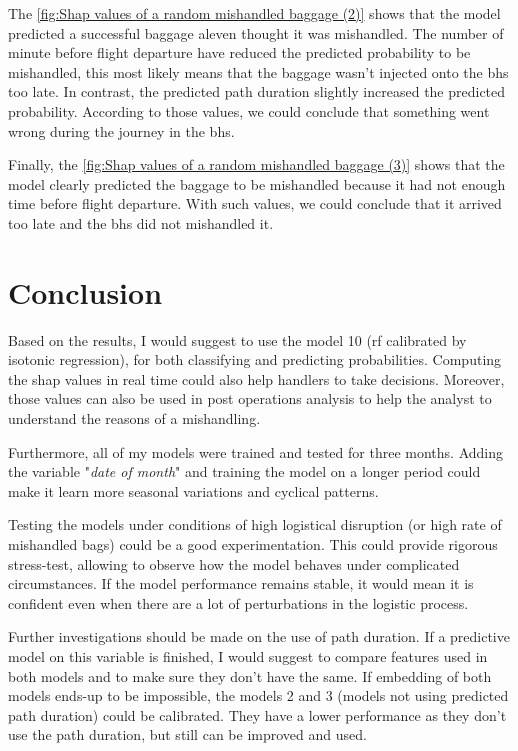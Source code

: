 \documentclass[12pt]{article}
\begin{document}
The \autoref{fig:Shap values of a random mishandled baggage (2)} shows that the model predicted a successful baggage aleven thought it was mishandled. The number of minute before flight departure have reduced the predicted probability to be mishandled, this most likely means that the baggage wasn't injected onto the \acrshort{bhs} too late. In contrast, the predicted path duration slightly increased the predicted probability. According to those values, we could conclude that something went wrong during the journey in the \acrshort{bhs}. \hfill \break

Finally, the \autoref{fig:Shap values of a random mishandled baggage (3)} shows that the model clearly predicted the baggage to be mishandled because it had not enough time before flight departure. With such values, we could conclude that it arrived too late and the \acrshort{bhs} did not mishandled it.

\section*{Conclusion}
\label{sec:Conclusion}


Based on the results, I would suggest to use the model 10 (\acrshort{rf} calibrated by isotonic regression), for both  classifying and predicting probabilities. Computing the shap values in real time could also help handlers to take decisions. Moreover, those values can also be used in post operations analysis to help the analyst to understand the reasons of a mishandling.

Furthermore, all of my models were trained and tested for three months. Adding the variable "\textit{date of month}" and training the model on a longer period could make it learn more seasonal variations and cyclical patterns.

Testing the models under conditions of high logistical disruption (or high rate of mishandled bags) could be a good experimentation. This could provide rigorous stress-test, allowing to observe how the model behaves under complicated circumstances. If the model performance remains stable, it would mean it is confident even when there are a lot of perturbations in the logistic process.

Further investigations should be made on the use of path duration. If a predictive model on this variable is finished, I would suggest to compare features used in both models and to make sure they don't have the same. If embedding of both models ends-up to be impossible, the models 2 and 3 (models not using predicted path duration) could be calibrated. They have a lower performance as they don't use the path duration, but still can be improved and used. 
\end{document}
